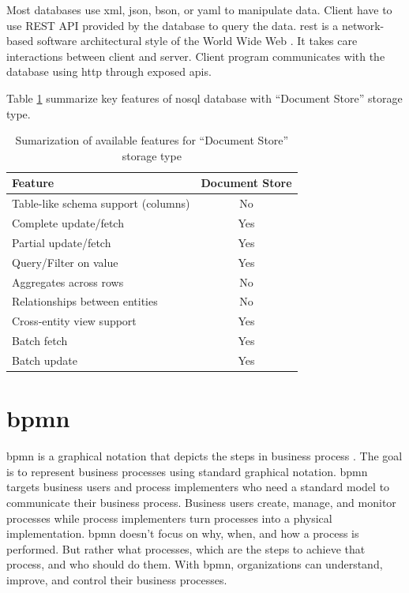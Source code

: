 Most databases use \gls{xml}, \gls{json}, \gls{bson}, or \gls{yaml} to manipulate data.
Client have to use REST API provided by the database to query the data.
\gls{rest} is a network-based software architectural style of the World Wide Web \cite{doglio, masse_2012}.
It takes care interactions between client and server.
Client program communicates with the database using \gls{http} through exposed \glspl{api}.

Table \ref{tbl:doctype-storage-feature} summarize key features of \gls{nosql} database with \enquote{Document Store} storage type.
\begin{table}[h]
	\centering
	\begin{tabular}{l c}
		\hline
		Feature                             &      Document Store \\
		\hline
		Table-like schema support (columns) &      No \\
		Complete update/fetch               &      Yes \\
		Partial update/fetch                &      Yes \\
		Query/Filter on	value               &      Yes \\
		Aggregates across rows              &      No \\
		Relationships between entities      &      No \\
		Cross-entity view support           &      Yes \\
		Batch fetch                         &      Yes \\
		Batch update                        &      Yes \\
		\hline
	\end{tabular}
	\caption{Sumarization of available features for \enquote{Document Store} storage type  \cite{vaish_2013}}
	\label{tbl:doctype-storage-feature}
\end{table}

\section{\gls{bpmn}}
\gls{bpmn} is a graphical notation that depicts the steps in business process \cite{bpmn_omg}.
The goal is to represent business processes using standard graphical notation.
\gls{bpmn} targets business users and process implementers who need a standard model to communicate their business process.
Business users create, manage, and monitor processes while process implementers turn processes into a physical implementation. 
\gls{bpmn} doesn't focus on why, when, and how a process is performed.
But rather what processes, which are the steps to achieve that process, and who should do them.
With \gls{bpmn}, organizations can understand, improve, and control their business processes.

